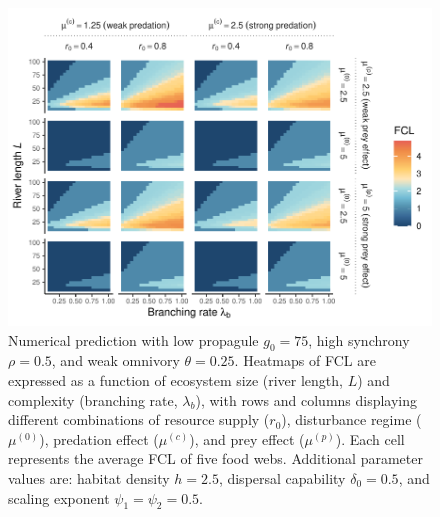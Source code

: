 \begin{figure}
\centering
\includegraphics{../data_fmt/fig_rho05_g75_theta025.pdf}
\caption{Numerical prediction with low propagule \(g_0 = 75\), high
synchrony \(\rho = 0.5\), and weak omnivory \(\theta = 0.25\). Heatmaps
of FCL are expressed as a function of ecosystem size (river length,
\(L\)) and complexity (branching rate, \(\lambda_b\)), with rows and
columns displaying different combinations of resource supply (\(r_0\)),
disturbance regime (\(\mu^{(0)}\)), predation effect (\(\mu^{(c)}\)),
and prey effect (\(\mu^{(p)}\)). Each cell represents the average FCL of
five food webs. Additional parameter values are: habitat density
\(h=2.5\), dispersal capability \(\delta_0=0.5\), and scaling exponent
\(\psi_1=\psi_2=0.5\).}
\end{figure}

\newpage

